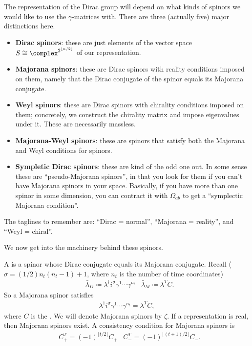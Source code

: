 \documentclass[11pt]{article}
\begin{document}
\begin{iidea}
    The representation of the Dirac group will depend on what kinds
    of spinors we would like to use the $\gamma$-matrices with.
    There are three (actually five) major distinctions here.
    \begin{itemize}
        \item \textbf{Dirac spinors}: these are just elements of
        the vector space $S \cong \complex^{2^{\lfloor n/2 \rfloor}}$ of our
        representation.
        \item \textbf{Majorana spinors}: these are Dirac spinors with
        reality conditions imposed on them, namely that the Dirac conjugate
        of the spinor equals its Majorana conjugate.
        \item \textbf{Weyl spinors}: these are Dirac spinors with chirality
        conditions imposed on them; concretely, we construct the chirality
        matrix and impose eigenvalues under it. These are necessarily massless. 
        \item \textbf{Majorana-Weyl spinors}: these are spinors that satisfy
        both the Majorana and Weyl conditions for spinors.
        \item \textbf{Sympletic Dirac spinors}: these are kind of the odd one out.
        In some sense these are ``pseudo-Majorana spinors'', in that you look for them
        if you can't have Majorana spinors in your space. Basically, if you have more 
        than one spinor in some dimension, you can contract it with $\Omega_{ab}$ to get a
        ``symplectic Majorana condition''.
    \end{itemize}
    The taglines to remember are: ``Dirac = normal'', ``Majorana = reality'',
    and ``Weyl = chiral''.
\end{iidea}

\noin
We now get into the machinery behind these spinors.

\begin{definition}
    A  is a spinor whose Dirac conjugate equals its
    Majorana conjugate. Recall ($\sigma = (1/2)n_t (n_t - 1) + 1$, where $n_t$
    is the number of time coordinates)
    \begin{align*}
        & \bar{\lambda}_D \coloneqq \lambda^\dagger i^{\sigma} \gamma^1 \cdots \gamma^{n_t}
        & \bar{\lambda}_M \coloneqq \lambda^T C.
    \end{align*}
    So a Majorana spinor satisfies
    \begin{align*}
        \lambda^\dagger i^\sigma \gamma^1 \cdots \gamma^{n_t} = \lambda^T C,
    \end{align*}
    where $C$ is the . We will
    denote Majorana spinors by $\zeta$. If a representation
    is real, then Majorana spinors exist. A consistency
    condition for Majorana spinors is
    \begin{align*}
        & C_+^T = (-1)^{\lfloor t/2 \rfloor} C_+
        & C_-^T = (-1)^{\lfloor (t + 1)/2 \rfloor} C_-.
    \end{align*}
\end{definition}
\end{document}
